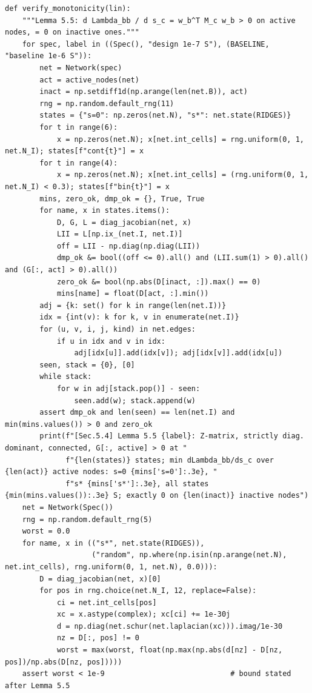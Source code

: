 \documentclass[11pt,a4paper]{article}
\theoremstyle{definition}
\theoremstyle{remark}
\begin{document}
\begin{lstlisting}
def verify_monotonicity(lin):
    """Lemma 5.5: d Lambda_bb / d s_c = w_b^T M_c w_b > 0 on active nodes, = 0 on inactive ones."""
    for spec, label in ((Spec(), "design 1e-7 S"), (BASELINE, "baseline 1e-6 S")):
        net = Network(spec)
        act = active_nodes(net)
        inact = np.setdiff1d(np.arange(len(net.B)), act)
        rng = np.random.default_rng(11)
        states = {"s=0": np.zeros(net.N), "s*": net.state(RIDGES)}
        for t in range(6):
            x = np.zeros(net.N); x[net.int_cells] = rng.uniform(0, 1, net.N_I); states[f"cont{t}"] = x
        for t in range(4):
            x = np.zeros(net.N); x[net.int_cells] = (rng.uniform(0, 1, net.N_I) < 0.3); states[f"bin{t}"] = x
        mins, zero_ok, dmp_ok = {}, True, True
        for name, x in states.items():
            D, G, L = diag_jacobian(net, x)
            LII = L[np.ix_(net.I, net.I)]
            off = LII - np.diag(np.diag(LII))
            dmp_ok &= bool((off <= 0).all() and (LII.sum(1) > 0).all() and (G[:, act] > 0).all())
            zero_ok &= bool(np.abs(D[inact, :]).max() == 0)
            mins[name] = float(D[act, :].min())
        adj = {k: set() for k in range(len(net.I))}
        idx = {int(v): k for k, v in enumerate(net.I)}
        for (u, v, i, j, kind) in net.edges:
            if u in idx and v in idx:
                adj[idx[u]].add(idx[v]); adj[idx[v]].add(idx[u])
        seen, stack = {0}, [0]
        while stack:
            for w in adj[stack.pop()] - seen:
                seen.add(w); stack.append(w)
        assert dmp_ok and len(seen) == len(net.I) and min(mins.values()) > 0 and zero_ok
        print(f"[Sec.5.4] Lemma 5.5 {label}: Z-matrix, strictly diag. dominant, connected, G[:, active] > 0 at "
              f"{len(states)} states; min dLambda_bb/ds_c over {len(act)} active nodes: s=0 {mins['s=0']:.3e}, "
              f"s* {mins['s*']:.3e}, all states {min(mins.values()):.3e} S; exactly 0 on {len(inact)} inactive nodes")
    net = Network(Spec())
    rng = np.random.default_rng(5)
    worst = 0.0
    for name, x in (("s*", net.state(RIDGES)),
                    ("random", np.where(np.isin(np.arange(net.N), net.int_cells), rng.uniform(0, 1, net.N), 0.0))):
        D = diag_jacobian(net, x)[0]
        for pos in rng.choice(net.N_I, 12, replace=False):
            ci = net.int_cells[pos]
            xc = x.astype(complex); xc[ci] += 1e-30j
            d = np.diag(net.schur(net.laplacian(xc))).imag/1e-30
            nz = D[:, pos] != 0
            worst = max(worst, float(np.max(np.abs(d[nz] - D[nz, pos])/np.abs(D[nz, pos]))))
    assert worst < 1e-9                             # bound stated after Lemma 5.5

\end{lstlisting}
\end{document}
